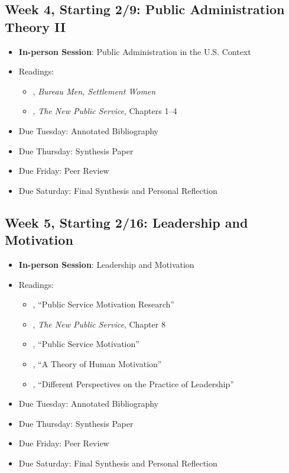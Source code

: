 \documentclass[12pt, letterpaper]{article}
\begin{document}
\subsection*{Week 4, Starting 2/9: Public Administration Theory II}
\begin{itemize}
    \item \textbf{In-person Session}: Public Administration in the U.S. Context
    \item Readings:
        \begin{itemize}
            \item \citet{Stivers2000}, \emph{Bureau Men, Settlement Women} 
            \item \citet{Denhardt2015}, \emph{The New Public Service}, Chapters 1--4 
        \end{itemize}
    \item Due Tuesday: Annotated Bibliography
    \item Due Thursday: Synthesis Paper
    \item Due Friday: Peer Review
    \item Due Saturday: Final Synthesis and Personal Reflection
\end{itemize}

\subsection*{Week 5, Starting 2/16: Leadership and Motivation}
\begin{itemize}
    \item \textbf{In-person Session}: Leadership and Motivation
    \item Readings:
        \begin{itemize}
            \item \citet{Christensen2017}, ``Public Service Motivation Research'' 
            \item \citet{Denhardt2015}, \emph{The New Public Service}, Chapter 8 
            \item \citet{Lachance2017}, ``Public Service Motivation'' 
            \item \citet{maslow1943}, ``A Theory of Human Motivation'' 
            \item \citet{Fairholm2004}, ``Different Perspectives on the Practice of Leadership'' 
        \end{itemize}
    \item Due Tuesday: Annotated Bibliography
    \item Due Thursday: Synthesis Paper
    \item Due Friday: Peer Review
    \item Due Saturday: Final Synthesis and Personal Reflection
\end{itemize}
\end{document}
